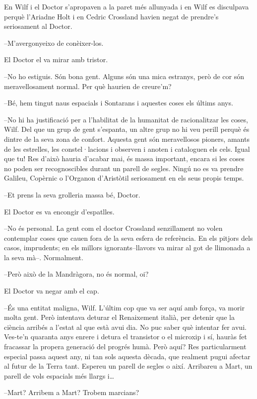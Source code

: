 En Wilf i el Doctor s'apropaven a la paret més allunyada i en Wilf es
disculpava perquè l'Ariadne Holt i en Cedric Crossland havien negat de
prendre's seriosament al Doctor.

--M'avergonyeixo de conèixer-los.

El Doctor el va mirar amb tristor.

--No ho estiguis. Són bona gent. Alguns són una mica estranys, però de
cor són meravellosament normal. Per què haurien de creure'm?

--Bé, hem tingut naus espacials i Sontarans i aquestes coses els últims
anys.

--No hi ha justificació per a l'habilitat de la humanitat de
racionalitzar les coses, Wilf. Del que un grup de gent s'espanta, un
altre grup no hi veu perill perquè és dintre de la seva zona de confort.
Aquesta gent són meravellosos pioners, amants de les estrelles, les
constel·lacions i observen i anoten i cataloguen els cels. Igual que tu!
Res d'això hauria d'acabar mai, és massa important, encara si les coses
no poden ser recognoscibles durant un parell de segles. Ningú no es va
prendre Galileu, Copèrnic o l'Organon d'Aristòtil seriosament en els
seus propis temps.

--Et prens la seva grolleria massa bé, Doctor.

El Doctor es va encongir d'espatlles.

--No és personal. La gent com el doctor Crossland senzillament no volen
contemplar coses que cauen fora de la seva esfera de referència. En els
pitjors dels casos, imprudents; en els millors ignorants--llavors va
mirar al got de llimonada a la seva mà--. Normalment.

--Però això de la Mandràgora, no és normal, oi?

El Doctor va negar amb el cap.

--És una entitat maligna, Wilf. L'últim cop que va ser aquí amb força,
va morir molta gent. Però intentava deturar el Renaixement italià, per
detenir que la ciència arribés a l'estat al que està avui dia. No puc
saber què intentar fer avui. Ves-te'n quaranta anys enrere i detura el
transistor o el microxip i sí, hauràs fet fracassar la propera generació
del progrés humà. Però aquí? Res particularment especial passa aquest
any, ni tan sols aquesta dècada, que realment pugui afectar al futur de
la Terra tant. Espereu un parell de segles o així. Arribareu a Mart, un
parell de vols espacials més llargs i\ldots{}

--Mart? Arribem a Mart? Trobem marcians?

